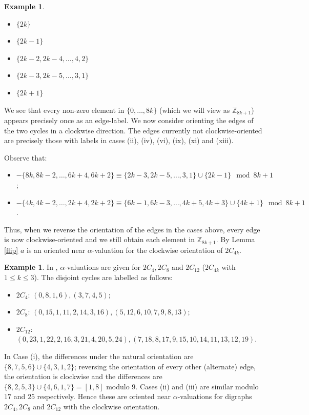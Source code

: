 \documentclass[12pt, a4paper]{article}
\theoremstyle{definition}
\newtheorem{example}[theorem]{Example}
\begin{document}
\begin{example}
\begin{itemize}
        \item [(x)]$\{2k\}$
        \item [(xi)]$\{2k-1\}$
        \item [(xii)]$\{2k-2,2k-4,\ldots,4,2\}$
        \item [(xiii)] $\{2k-3,2k-5,\ldots,3,1\}$
        \item [(xiv)]$\{2k+1\}$
    \end{itemize}
We see that every non-zero element in $\{0,\ldots, 8k\}$ (which we will view as $\mathbb{Z}_{8k+1}$) appears precisely once as an edge-label.
We now consider orienting the edges of the two cycles in a clockwise direction. The edges currently not clockwise-oriented are precisely those with labels in cases (ii), (iv), (vi), (ix), (xi) and (xiii).

Observe that:
\begin{itemize}
\item $-\{8k,8k-2,\ldots, 6k+4,6k+2\} \equiv \{2k-3,2k-5,\ldots,3,1\} \cup \{2k-1\} \mod 8k+1$;
\item $-\{4k,4k-2,\ldots,2k+4,2k+2\} \equiv \{6k-1,6k-3,\ldots, 4k+5,4k+3\} \cup \{4k+1\} \mod 8k+1$.
\end{itemize}
Thus, when we reverse the orientation of the edges in the cases above, every edge is now clockwise-oriented and we still obtain each element in $\mathbb{Z}_{8k+1}$. By Lemma \ref{flip} $a$ is an oriented near $\alpha$-valuation for the clockwise orientation of $2C_{4k}$.
\end{example}

\begin{example}\label{ex:2C4ksmall}
In \cite{Abr}, $\alpha$-valuations are given for $2C_4,2C_8$ and $2C_{12}$ ($2C_{4k}$ with $1 \leq k \leq 3$).  The disjoint cycles are labelled as follows:
\begin{itemize}
\item[(i)] $2C_4$: $(0,8,1,6), (3,7,4,5)$;
\item[(ii)] $2C_8$: $(0,15,1,11,2,14,3,16),(5,12,6,10,7,9,8,13)$;
\item[(iii)] $2C_{12}$: $(0, 23, 1, 22, 2, 16, 3, 21, 4, 20, 5, 24), (7, 18, 8, 17,9, 15, 10, 14, 11, 13, 12, 19)$.
\end{itemize}
In Case (i), the differences under the natural orientation are $\{8,7,5,6\} \cup\{4,3,1,2\}$; reversing the orientation of every other (alternate) edge, the orientation is clockwise and the differences are $\{8,2,5,3\} \cup \{4,6,1,7\}=[1,8]$ modulo $9$.  Cases (ii) and (iii) are similar modulo $17$ and $25$ respectively.  Hence these are oriented near $\alpha$-valuations for digraphs $2C_4,2C_8$ and $2C_{12}$ with the clockwise orientation.
\end{example}
\end{document}
